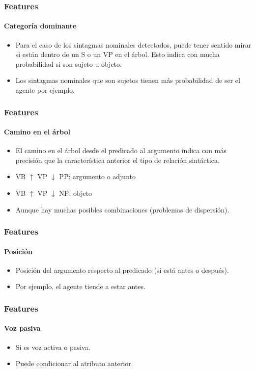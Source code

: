 \documentclass{beamer}
\begin{document}
\begin{frame}
  \frametitle{Features}
  \framesubtitle{Categoría dominante}

  \begin{itemize}
    \item Para el caso de los sintagmas nominales detectados, puede tener sentido mirar si están dentro de un S o un VP en el árbol. Esto indica con mucha probabilidad si son sujeto u objeto.
    \item Los sintagmas nominales que son sujetos tienen más probabilidad de ser el agente por ejemplo.
  \end{itemize}
\end{frame}

\begin{frame}
  \frametitle{Features}
  \framesubtitle{Camino en el árbol}

  \begin{itemize}
    \item El camino en el árbol desde el predicado al argumento indica con más precisión que la característica anterior el tipo de relación sintáctica.
    \item VB $\uparrow$ VP $\downarrow$ PP\@: argumento o adjunto
    \item VB $\uparrow$ VP $\downarrow$ NP\@: objeto
    \item Aunque hay muchas posibles combinaciones (problemas de dispersión).
  \end{itemize}
\end{frame}

\begin{frame}
  \frametitle{Features}
  \framesubtitle{Posición}

  \begin{itemize}
    \item Posición del argumento respecto al predicado (si está antes o después).

    \item Por ejemplo, el agente tiende a estar antes.
  \end{itemize}
\end{frame}

\begin{frame}
  \frametitle{Features}
  \framesubtitle{Voz pasiva}

  \begin{itemize}
    \item Si es voz activa o pasiva.

    \item Puede condicionar al atributo anterior.
  \end{itemize}
\end{frame}
\end{document}
